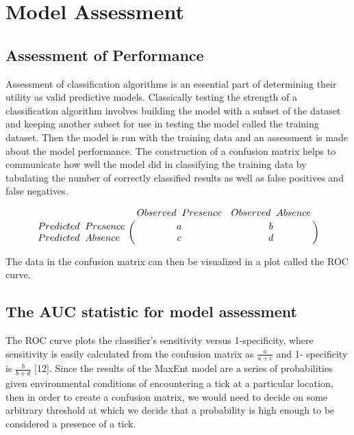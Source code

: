 

\section{Model Assessment }  %

\subsection{Assessment of Performance }

Assessment of classification algorithms is an essential part of determining their utility as valid predictive models. Classically testing the strength of a classification algorithm involves building the model with a subset of the dataset and keeping another subset for use in testing the model called the training dataset. Then the model is run with the training data and an assessment is made about the model performance. The construction of a confusion matrix helps to communicate how well the model did in classifying the training data by tabulating the number of correctly classified results as well as false positives and false negatives. 

\begin{equation} \bordermatrix{~ & Observed \hspace{0.2cm} Presence & Observed \hspace{0.2cm} Absence \cr
                  Predicted\hspace{0.2cm}  Presence & a & b \cr
                  Predicted \hspace{0.2cm} Absence & c & d \cr} \end{equation}
                  
\noindent The data in the confusion matrix can then be visualized in a plot called the ROC curve. \newline

\subsection{The AUC statistic for model assessment }

The ROC curve plots the classifier's sensitivity versus 1-specificity, where sensitivity is easily calculated from the confusion matrix as  $\frac{a}{a+c}$ and 1- specificity is $\frac{b}{b+d}$ [12]. Since the results of the MaxEnt model are a series of probabilities given environmental conditions of encountering a tick at a particular location, then in order to create a confusion matrix, we would need to decide on some arbitrary threshold at which we decide that a probability is high enough to be considered a presence of a tick. \newline

